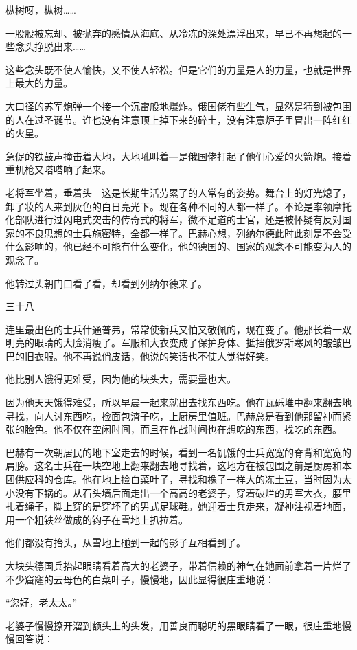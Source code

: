 枞树呀，枞树……

一股股被忘却、被抛弃的感情从海底、从冷冻的深处漂浮出来，早已不再想起的一些念头挣脱出来……

这些念头既不使人愉快，又不使人轻松。但是它们的力量是人的力量，也就是世界上最大的力量。

大口径的苏军炮弹一个接一个沉雷般地爆炸。俄国佬有些生气，显然是猜到被包围的人在过圣诞节。谁也没有注意顶上掉下来的碎土，没有注意炉子里冒出一阵红红的火星。

急促的铁鼓声撞击着大地，大地吼叫着—是俄国佬打起了他们心爱的火箭炮。接着重机枪又嗒嗒响了起来。

老将军坐着，垂着头—这是长期生活劳累了的人常有的姿势。舞台上的灯光熄了，卸了妆的人来到灰色的白日亮光下。现在各种不同的人都一样了。不论是率领摩托化部队进行过闪电式突击的传奇式的将军，微不足道的士官，还是被怀疑有反对国家的不良思想的士兵施密特，全都一样了。巴赫心想，列纳尔德此时此刻是不会受什么影响的，他已经不可能有什么变化，他的德国的、国家的观念不可能变为人的观念了。

他转过头朝门口看了看，却看到列纳尔德来了。

三十八

连里最出色的士兵什通普弗，常常使新兵又怕又敬佩的，现在变了。他那长着一双明亮的眼睛的大脸消瘦了。军服和大衣变成了保护身体、抵挡俄罗斯寒风的皱皱巴巴的旧衣服。他不再说俏皮话，他说的笑话也不使人觉得好笑。

他比别人饿得更难受，因为他的块头大，需要量也大。

因为他天天饿得难受，所以早晨一起来就出去找东西吃。他在瓦砾堆中翻来翻去地寻找，向人讨东西吃，捡面包渣子吃，上厨房里值班。巴赫总是看到他那留神而紧张的脸色。他不仅在空闲时间，而且在作战时间也在想吃的东西，找吃的东西。

巴赫有一次朝居民的地下室走去的时候，看到一名饥饿的士兵宽宽的脊背和宽宽的肩膀。这名士兵在一块空地上翻来翻去地寻找着，这地方在被包围之前是厨房和本团供应科的仓库。他在地上捡白菜叶子，寻找和橡子一样大的冻土豆，当时因为太小没有下锅的。从石头墙后面走出一个高高的老婆子，穿着破烂的男军大衣，腰里扎着绳子，脚上穿的是穿坏了的男式足球鞋。她迎着士兵走来，凝神注视着地面，用一个粗铁丝做成的钩子在雪地上扒拉着。

他们都没有抬头，从雪地上碰到一起的影子互相看到了。

大块头德国兵抬起眼睛看着高大的老婆子，带着信赖的神气在她面前拿着一片烂了不少窟窿的云母色的白菜叶子，慢慢地，因此显得很庄重地说：

“您好，老太太。”

老婆子慢慢撩开溜到额头上的头发，用善良而聪明的黑眼睛看了一眼，很庄重地慢慢回答说：

